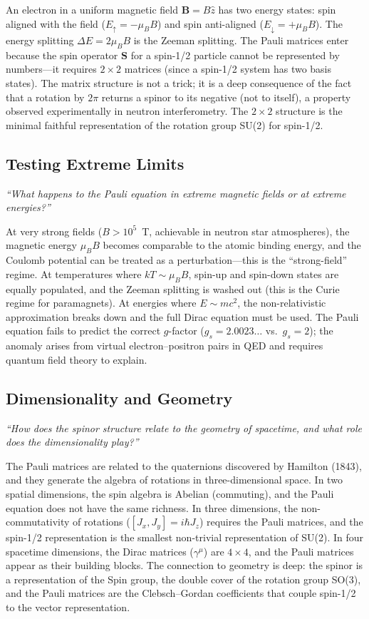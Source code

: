 \documentclass[11pt,openright]{book}
\begin{document}
An electron in a uniform magnetic field $\mathbf{B} = B\hat{z}$ has two energy states: spin aligned with the field ($E_{\uparrow} = -\mu_{B}B$) and spin anti-aligned ($E_{\downarrow} = +\mu_{B}B$). The energy splitting $\Delta E = 2\mu_{B}B$ is the Zeeman splitting. The Pauli matrices enter because the spin operator $\mathbf{S}$ for a spin-1/2 particle cannot be represented by numbers---it requires $2 \times 2$ matrices (since a spin-1/2 system has two basis states). The matrix structure is not a trick; it is a deep consequence of the fact that a rotation by $2\pi$ returns a spinor to its negative (not to itself), a property observed experimentally in neutron interferometry. The $2 \times 2$ structure is the minimal faithful representation of the rotation group SU(2) for spin-1/2.

\subsection*{Testing Extreme Limits}
\textit{``What happens to the Pauli equation in extreme magnetic fields or at extreme energies?''}

At very strong fields ($B > 10^{5}$~T, achievable in neutron star atmospheres), the magnetic energy $\mu_{B}B$ becomes comparable to the atomic binding energy, and the Coulomb potential can be treated as a perturbation---this is the ``strong-field'' regime. At temperatures where $kT \sim \mu_{B}B$, spin-up and spin-down states are equally populated, and the Zeeman splitting is washed out (this is the Curie regime for paramagnets). At energies where $E \sim mc^{2}$, the non-relativistic approximation breaks down and the full Dirac equation must be used. The Pauli equation fails to predict the correct $g$-factor ($g_{s} = 2.0023\ldots$ vs.\ $g_{s} = 2$); the anomaly arises from virtual electron--positron pairs in QED and requires quantum field theory to explain.

\subsection*{Dimensionality and Geometry}
\textit{``How does the spinor structure relate to the geometry of spacetime, and what role does the dimensionality play?''}

The Pauli matrices are related to the quaternions discovered by Hamilton (1843), and they generate the algebra of rotations in three-dimensional space. In two spatial dimensions, the spin algebra is Abelian (commuting), and the Pauli equation does not have the same richness. In three dimensions, the non-commutativity of rotations ($[J_{x}, J_{y}] = i\hbar J_{z}$) requires the Pauli matrices, and the spin-1/2 representation is the smallest non-trivial representation of SU(2). In four spacetime dimensions, the Dirac matrices ($\gamma^{\mu}$) are $4 \times 4$, and the Pauli matrices appear as their building blocks. The connection to geometry is deep: the spinor is a representation of the Spin group, the double cover of the rotation group SO(3), and the Pauli matrices are the Clebsch--Gordan coefficients that couple spin-1/2 to the vector representation.
\end{document}
